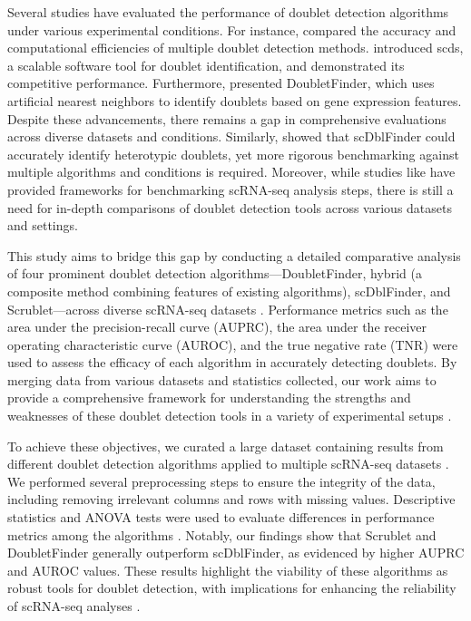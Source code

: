 \documentclass[11pt]{article}
\begin{document}
Several studies have evaluated the performance of doublet detection algorithms under various experimental conditions. For instance, \cite{Xi2020BenchmarkingCD} compared the accuracy and computational efficiencies of multiple doublet detection methods. \cite{Bais2019scdsCA} introduced scds, a scalable software tool for doublet identification, and demonstrated its competitive performance. Furthermore, \cite{McGinnis2018DoubletFinderDD} presented DoubletFinder, which uses artificial nearest neighbors to identify doublets based on gene expression features. Despite these advancements, there remains a gap in comprehensive evaluations across diverse datasets and conditions. Similarly, \cite{Germain2021DoubletII} showed that scDblFinder could accurately identify heterotypic doublets, yet more rigorous benchmarking against multiple algorithms and conditions is required. Moreover, while studies like \cite{Tian2019BenchmarkingSC} have provided frameworks for benchmarking scRNA-seq analysis steps, there is still a need for in-depth comparisons of doublet detection tools across various datasets and settings.

This study aims to bridge this gap by conducting a detailed comparative analysis of four prominent doublet detection algorithms—DoubletFinder, hybrid (a composite method combining features of existing algorithms), scDblFinder, and Scrublet—across diverse scRNA-seq datasets \cite{Pont2019SingleCellSE, Freytag2018ComparisonOC}. Performance metrics such as the area under the precision-recall curve (AUPRC), the area under the receiver operating characteristic curve (AUROC), and the true negative rate (TNR) were used to assess the efficacy of each algorithm in accurately detecting doublets. By merging data from various datasets and statistics collected, our work aims to provide a comprehensive framework for understanding the strengths and weaknesses of these doublet detection tools in a variety of experimental setups \cite{Jain2023SinglecellRS, Reyfman2019SingleCellTA}.

To achieve these objectives, we curated a large dataset containing results from different doublet detection algorithms applied to multiple scRNA-seq datasets \cite{Deb2014AnEM}. We performed several preprocessing steps to ensure the integrity of the data, including removing irrelevant columns and rows with missing values. Descriptive statistics and ANOVA tests were used to evaluate differences in performance metrics among the algorithms \cite{Padilla2020ASO}. Notably, our findings show that Scrublet and DoubletFinder generally outperform scDblFinder, as evidenced by higher AUPRC and AUROC values. These results highlight the viability of these algorithms as robust tools for doublet detection, with implications for enhancing the reliability of scRNA-seq analyses \cite{Germain2021DoubletII, McGinnis2018DoubletFinderDD}.
\end{document}
